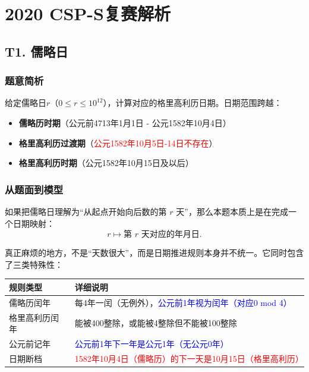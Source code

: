 \documentclass{book}
\begin{document}
\chapter{2020 CSP-S复赛解析}
\newpage

\section{T1. 儒略日} %

\subsection{题意简析}
给定儒略日$r$（$0 \leq r \leq 10^{12}$），计算对应的格里高利历日期。日期范围跨越：
\begin{itemize}
    \item \textbf{儒略历时期}（公元前4713年1月1日 - 公元1582年10月4日）
    \item \textbf{格里高利历过渡期}（\textcolor{red}{公元1582年10月5日-14日不存在}）
    \item \textbf{格里高利历时期}（公元1582年10月15日及以后）
\end{itemize}

\subsection{从题面到模型}

如果把儒略日理解为“从起点开始向后数的第 $r$ 天”，那么本题本质上是在完成一个日期映射：
\[
r\longmapsto \text{第 }r\text{ 天对应的年月日}.
\]

真正麻烦的地方，不是“天数很大”，而是日期推进规则本身并不统一。它同时包含了三类特殊性：

\begin{table}[h]
    \centering
    \begin{tabularx}{\linewidth}{|l|X|}
    \hline
    \textbf{规则类型} & \textbf{详细说明} \\ \hline
    儒略历闰年 & 每4年一闰（无例外），\textcolor{blue}{公元前1年视为闰年（对应0 mod 4）} \\ \hline
    格里高利历闰年 & 能被400整除，或能被4整除但不能被100整除 \\ \hline
    公元前记年 & \textcolor{blue}{公元前1年下一年是公元1年（无公元0年）} \\ \hline
    日期断档 & \textcolor{red}{1582年10月4日（儒略历）的下一天是10月15日（格里高利历）} \\ \hline
    \end{tabularx}
\end{table}
\end{document}
